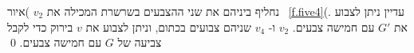 
נחליף ביניהם את שני ההצבעים בשרשרת המכילה את
$v_2$
)איור~%
\ref{f.five4}(.
עדיין ניתן לצבוע את
$G'$
עם חמישה צבעים.
$v_2$
ו-%
$v_4$
שניהם צבועים בכתום, וניתן לצבוע את
$v$
בירוק כדי לקבל צביעה של
$G$
עם חמישה צבעים.
\qed

